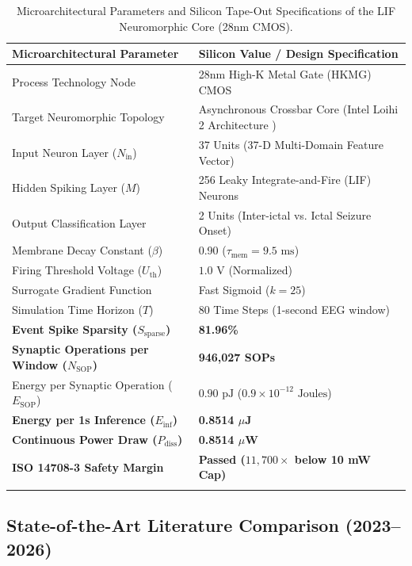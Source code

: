 \documentclass[pdflatex,sn-mathphys-num]{sn-jnl}%
\begin{document}
\begin{table}[htbp]
\caption{Microarchitectural Parameters and Silicon Tape-Out Specifications of the LIF Neuromorphic Core (28nm CMOS).}\label{tab4}
\begin{tabular}{@{}ll@{}}
\toprule
Microarchitectural Parameter & Silicon Value / Design Specification \\
\midrule
Process Technology Node & 28nm High-K Metal Gate (HKMG) CMOS \\
Target Neuromorphic Topology & Asynchronous Crossbar Core (Intel Loihi 2 Architecture \cite{davies2018loihi}) \\
Input Neuron Layer ($N_{\text{in}}$) & 37 Units (37-D Multi-Domain Feature Vector) \\
Hidden Spiking Layer ($M$) & 256 Leaky Integrate-and-Fire (LIF) Neurons \\
Output Classification Layer & 2 Units (Inter-ictal vs. Ictal Seizure Onset) \\
Membrane Decay Constant ($\beta$) & 0.90 ($\tau_{\text{mem}} = 9.5\text{ ms}$) \\
Firing Threshold Voltage ($U_{\text{th}}$) & $1.0\text{ V}$ (Normalized) \\
Surrogate Gradient Function & Fast Sigmoid ($k = 25$) \cite{eshraghian2023training} \\
Simulation Time Horizon ($T$) & 80 Time Steps (1-second EEG window) \\
\textbf{Event Spike Sparsity ($S_{\text{sparse}}$)} & \textbf{81.96\%} \\
\textbf{Synaptic Operations per Window ($N_{\text{SOP}}$)} & \textbf{946,027 SOPs} \\
Energy per Synaptic Operation ($E_{\text{SOP}}$) & $0.90\text{ pJ}$ ($0.9 \times 10^{-12}\text{ Joules}$) \cite{davies2018loihi} \\
\textbf{Energy per 1s Inference ($E_{\text{inf}}$)} & \textbf{0.8514 $\mu$J} \\
\textbf{Continuous Power Draw ($P_{\text{diss}}$)} & \textbf{0.8514 $\mu$W} \\
\textbf{ISO 14708-3 Safety Margin} & \textbf{Passed ($11,700\times$ below 10 mW Cap)} \\
\botrule
\end{tabular}
\end{table}

\subsection{State-of-the-Art Literature Comparison (2023--2026)}
\end{document}
